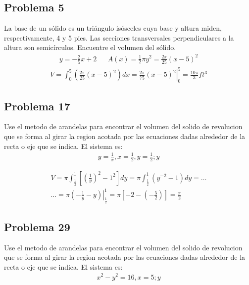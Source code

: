 \documentclass{article}
\begin{document}
\subsection{Problema 5}
La base de un sólido es un triángulo isósceles cuya base y altura miden, respectivamente, 4 y 5 pies. Las secciones transversales perpendiculares a la altura son semicírculos. Encuentre el volumen del sólido.
\begin{align*}
  y = -\frac{2}{5}x+2 &  & A(x) = \frac{1}{2}\pi y^2 = \frac{2\pi}{25}(x-5)^2
\end{align*}
\begin{align*}
  V= \int_{0}^{5} \left(\frac{2\pi}{25}(x-5)^2 \right)dx = \left.\frac{2\pi}{75}(x-5)^2 \right|_0^5 =\frac{10\pi}{3}ft^3
\end{align*}

\subsection{Problema 17}
Use el metodo de arandelas para encontrar el volumen del solido de revolucion que se forma al girar la region acotada por las ecuaciones dadas alrededor de la recta o eje que se indica.
El sistema es:
\begin{align*}
  y = \frac{1}{x}, x = \frac{1}{2},y = \frac{1}{2} ; y
\end{align*}
\begin{center}
\end{center}
\begin{align*}
  V = \pi \int_{\frac{1}{2}}^{1}\left[\left(\frac{1}{y}\right)^2-1^2\right]dy = \pi\int_{\frac{1}{2}}^{1}(y^{-2}-1)dy = \dots \\ \dots = \pi\left.\left(-\frac{1}{y}-y\right)\right|_{\frac{1}{2}}^1 = \pi \left[-2-\left(-\frac{5}{2}\right)\right] = \frac{\pi}{2}
\end{align*}
\subsection{Problema 29}
Use el metodo de arandelas para encontrar el volumen del solido de revolucion que se forma al girar la region acotada por las ecuaciones dadas alrededor de la recta o eje que se indica.
El sistema es:
\begin{align*}
  x^2-y^2=16,x=5;y
\end{align*}
\end{document}
